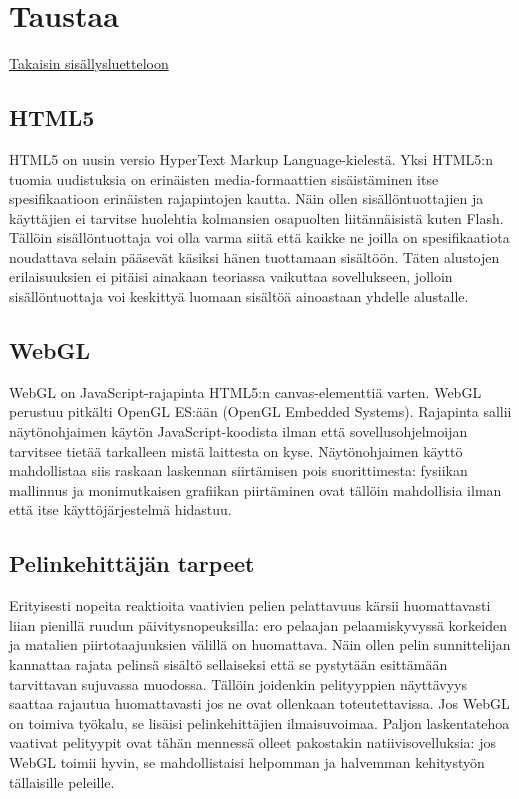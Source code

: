 \section{Taustaa}
\label{sec:taustaa}
\hyperlink{index}{Takaisin sisällysluetteloon}

\subsection{HTML5}
HTML5 on uusin versio HyperText Markup Language-kielestä. Yksi HTML5:n tuomia uudistuksia on erinäisten media-formaattien sisäistäminen itse spesifikaatioon erinäisten rajapintojen kautta\hyperlink{}{\cite{html5diff}}. Näin ollen sisällöntuottajien ja käyttäjien ei tarvitse huolehtia kolmansien osapuolten liitännäisistä kuten Flash. Tällöin sisällöntuottaja voi olla varma siitä että kaikke ne joilla on spesifikaatiota noudattava selain pääsevät käsiksi hänen tuottamaan sisältöön. Täten alustojen erilaisuuksien ei pitäisi ainakaan teoriassa vaikuttaa sovellukseen, jolloin sisällöntuottaja voi keskittyä luomaan sisältöä ainoastaan yhdelle alustalle.

\subsection{WebGL}
WebGL on JavaScript-rajapinta HTML5:n canvas-elementtiä varten. WebGL perustuu pitkälti OpenGL ES:ään (OpenGL Embedded Systems)\hyperlink{}{\cite{webgl_specification}}. Rajapinta sallii näytönohjaimen käytön JavaScript-koodista ilman että sovellusohjelmoijan tarvitsee tietää tarkalleen mistä laittesta on kyse. Näytönohjaimen käyttö mahdollistaa siis raskaan laskennan siirtämisen pois suorittimesta: fysiikan mallinnus ja monimutkaisen grafiikan piirtäminen ovat tällöin mahdollisia ilman että itse käyttöjärjestelmä hidastuu.

\subsection{Pelinkehittäjän tarpeet}
Erityisesti nopeita reaktioita vaativien pelien pelattavuus kärsii huomattavasti liian pienillä ruudun päivitysnopeuksilla: ero pelaajan pelaamiskyvyssä korkeiden ja matalien piirtotaajuuksien välillä on huomattava\hyperlink{}{\cite{claypool_fps}}. Näin ollen pelin sunnittelijan kannattaa rajata pelinsä sisältö sellaiseksi että se pystytään esittämään tarvittavan sujuvassa muodossa. Tällöin joidenkin pelityyppien näyttävyys saattaa rajautua huomattavasti jos ne ovat ollenkaan toteutettavissa. Jos WebGL on toimiva työkalu, se lisäisi pelinkehittäjien ilmaisuvoimaa. Paljon laskentatehoa vaativat pelityypit ovat tähän mennessä olleet pakostakin natiivisovelluksia: jos WebGL toimii hyvin, se mahdollistaisi helpomman ja halvemman kehitystyön tällaisille peleille.
